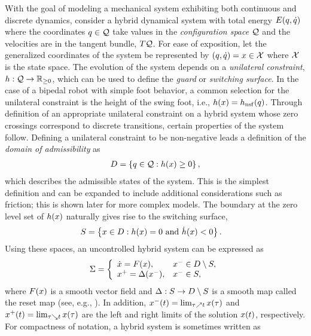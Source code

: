 With the goal of modeling a mechanical system exhibiting both continuous and
discrete dynamics, consider a hybrid dynamical system with total energy
$E(q, \dot{q})$ where the coordinates $q \in \mathcal{Q}$ take values in the {\em
  configuration space} $\mathcal{Q}$ and the velocities are in the tangent bundle,
$T\mathcal{Q}$.
%
For ease of exposition, let the generalized coordinates of the system be
represented by $(q, \dot{q}) = x \in \mathcal{X}$ where $\mathcal{X}$ is the state space.
%
The evolution of the system depends on a {\em unilateral constraint}, $h :
\mathcal{Q} \to \mathbb{R}_{\geq 0}$, which can be used to define the {\em guard} or {\em switching
  surface}.
%
In the case of a bipedal robot with simple foot behavior, a common selection for
the unilateral constraint is the height of the swing foot, i.e., $h(x) =
h_{\mathrm{nsf}}(q)$.
%
Through definition of an appropriate unilateral constraint on a hybrid system
whose zero crossings correspond to discrete transitions, certain properties of
the system follow.
%
Defining a unilateral constraint to be non-negative leads a definition of the
{\em domain of admissibility} as
%
\begin{align}
  \label{eq:domain}
  D = \left\{ q \in \mathcal{Q} : h(x) \geq 0 \right\},
\end{align}
%
which describes the admissible states of the system.
%
This is the simplest definition and can be expanded to include additional
considerations such as friction; this is shown later for more complex models.
%
The boundary at the zero level set of $h(x)$ naturally gives rise to the
switching surface,
%
\begin{align}
  \label{eq:guard}
  S &= \left\{ x \in D  : h(x) = 0 \mbox{ and } {\dot {h}}(x) < 0
  \right\}.
\end{align}
%
Using these spaces, an uncontrolled hybrid system can be expressed as
%
\begin{align}
  \Sigma = \left\{
  \begin{array}{l l}
    {\dot {x}} = F(x), & x^{-} \in D \setminus S,\\
    x^{+} = \Delta(x^{-}), & x^{-} \in S,
  \end{array}\right.
  \label{eq:hsys}
\end{align}
%
where $F(x)$ is a smooth vector field and $\Delta : S \to D \setminus
S$ is a smooth map called the reset map (see, e.g., \cite{Morris2005}).
%
In addition, $x^{-}(t) = \lim_{\tau \nearrow t} x(\tau)$ and $x^{+}(t) =
\lim_{\tau \searrow t} x(\tau)$ are the left and right limits of the solution
$x(t)$, respectively.
%
For compactness of notation, a hybrid system is sometimes written as
